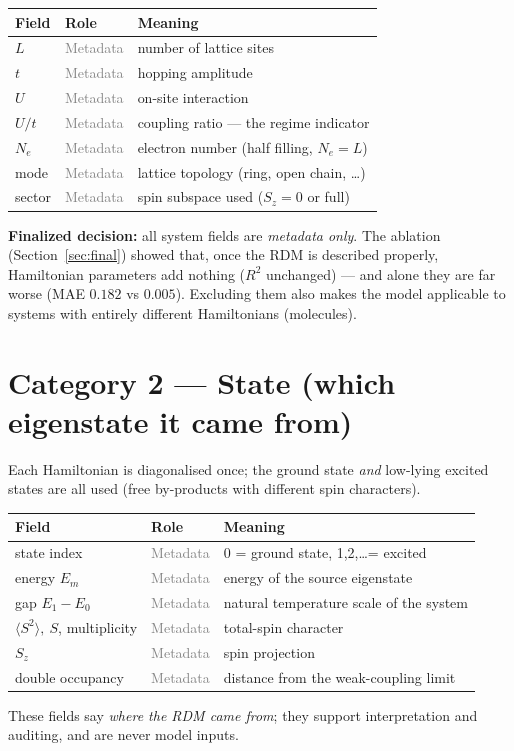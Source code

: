 \documentclass[11pt]{article}
\newcommand{\meta}{\textcolor{gray}{Metadata}}
\begin{document}
\begin{center}
\begin{tabular}{@{}llp{8.6cm}@{}}
\toprule
Field & Role & Meaning \\ \midrule
$L$        & \meta{} & number of lattice sites \\
$t$        & \meta{} & hopping amplitude \\
$U$        & \meta{} & on-site interaction \\
$U/t$      & \meta{} & coupling ratio --- the regime indicator \\
$N_e$      & \meta{} & electron number (half filling, $N_e=L$) \\
mode       & \meta{} & lattice topology (ring, open chain, \dots) \\
sector     & \meta{} & spin subspace used ($S_z{=}0$ or full) \\
\bottomrule
\end{tabular}
\end{center}
\textbf{Finalized decision:} all system fields are \emph{metadata only}. The
ablation (Section~\ref{sec:final}) showed that, once the RDM is described
properly, Hamiltonian parameters add nothing ($R^2$ unchanged) --- and alone
they are far worse (MAE $0.182$ vs $0.005$). Excluding them also makes the
model applicable to systems with entirely different Hamiltonians (molecules).

\section{Category 2 --- State (which eigenstate it came from)}
Each Hamiltonian is diagonalised once; the ground state \emph{and} low-lying
excited states are all used (free by-products with different spin characters).

\begin{center}
\begin{tabular}{@{}llp{8.6cm}@{}}
\toprule
Field & Role & Meaning \\ \midrule
state index          & \meta{} & 0 = ground state, 1,2,\dots = excited \\
energy $E_m$         & \meta{} & energy of the source eigenstate \\
gap $E_1{-}E_0$      & \meta{} & natural temperature scale of the system \\
$\langle S^2\rangle,\ S$, multiplicity & \meta{} & total-spin character \\
$S_z$                & \meta{} & spin projection \\
double occupancy     & \meta{} & distance from the weak-coupling limit \\
\bottomrule
\end{tabular}
\end{center}
These fields say \emph{where the RDM came from}; they support interpretation
and auditing, and are never model inputs.
\end{document}
